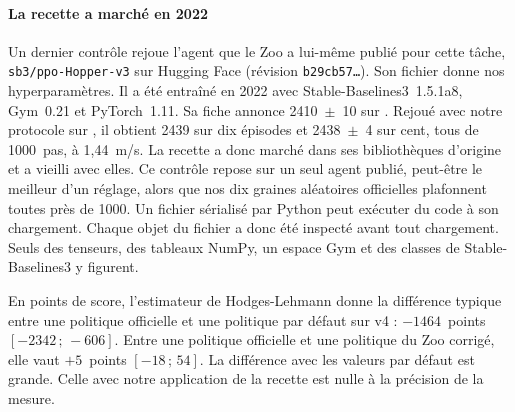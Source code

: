 
\paragraph{La recette a marché en 2022}
Un dernier contrôle rejoue l'agent que le Zoo a lui-même publié pour
cette tâche, \texttt{sb3/ppo-Hopper-v3} sur Hugging Face (révision \texttt{b29cb57\dots}). Son fichier  donne nos hyperparamètres. Il a été entraîné
en 2022 avec Stable-Baselines3~1.5.1a8, Gym~0.21 et PyTorch~1.11. Sa fiche annonce \num{2410}~$\pm$~10 sur
. Rejoué avec notre protocole sur , il obtient \num{2439} sur dix épisodes et
\num{2438}~$\pm$~4 sur cent, tous de \num{1000}~pas, à 1,44~m/s. La recette a donc marché dans ses bibliothèques d'origine et a vieilli avec elles.
Ce contrôle repose sur un seul agent publié, peut-être le meilleur d'un réglage, alors que nos dix graines
aléatoires officielles plafonnent toutes près de \num{1000}. Un fichier sérialisé par Python peut exécuter du
code à son chargement. Chaque objet du fichier a donc été inspecté avant tout chargement. Seuls des tenseurs,
des tableaux NumPy, un espace Gym et des classes de Stable-Baselines3 y figurent.

En points de score, l'estimateur de Hodges-Lehmann donne
la différence typique entre une politique officielle et une politique par défaut sur v4 : $-\num{1464}$~points
$[-\num{2342}\,;\,-606]$. Entre une politique officielle et une politique du Zoo corrigé, elle vaut $+5$~points
$[-18\,;\,54]$. La différence avec les valeurs par défaut est grande. Celle avec notre application de la
recette est nulle à la précision de la mesure.

